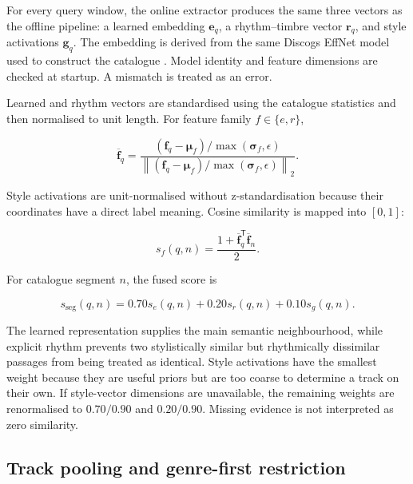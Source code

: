 For every query window, the online extractor produces the same three vectors
as the offline pipeline: a learned embedding $\mathbf{e}_q$, a rhythm--timbre
vector $\mathbf{r}_q$, and style activations $\mathbf{g}_q$. The embedding is
derived from the same Discogs EffNet model used to construct the catalogue
\cite{alonso2022music}. Model identity and feature dimensions are checked at
startup. A mismatch is treated as an error.

Learned and rhythm vectors are standardised using the catalogue statistics and
then normalised to unit length. For feature family $f\in\{e,r\}$,

\begin{equation}
    \overline{\mathbf{f}}_q=
    \frac{(\mathbf{f}_q-\boldsymbol{\mu}_f)
          /\max(\boldsymbol{\sigma}_f,\epsilon)}
         {\left\|(\mathbf{f}_q-\boldsymbol{\mu}_f)
          /\max(\boldsymbol{\sigma}_f,\epsilon)\right\|_2}.
    \label{eq:ch5_query_standardisation}
\end{equation}

Style activations are unit-normalised without z-standardisation because their
coordinates have a direct label meaning. Cosine similarity is mapped into
$[0,1]$:

\begin{equation}
    s_f(q,n)=\frac{1+\overline{\mathbf{f}}_q^{\mathsf{T}}
        \overline{\mathbf{f}}_n}{2}.
    \label{eq:ch5_mapped_cosine}
\end{equation}

For catalogue segment $n$, the fused score is

\begin{equation}
    s_{\mathrm{seg}}(q,n)
    =0.70s_e(q,n)+0.20s_r(q,n)+0.10s_g(q,n).
    \label{eq:ch5_segment_fusion}
\end{equation}

The learned representation supplies the main semantic neighbourhood, while
explicit rhythm prevents two stylistically similar but rhythmically dissimilar
passages from being treated as identical. Style activations have the smallest
weight because they are useful priors but are too coarse to determine a track
on their own. If style-vector dimensions are unavailable, the remaining
weights are renormalised to $0.70/0.90$ and $0.20/0.90$. Missing evidence is
not interpreted as zero similarity.

\subsection{Track pooling and genre-first restriction}
\label{subsec:ch5_track_pooling}

